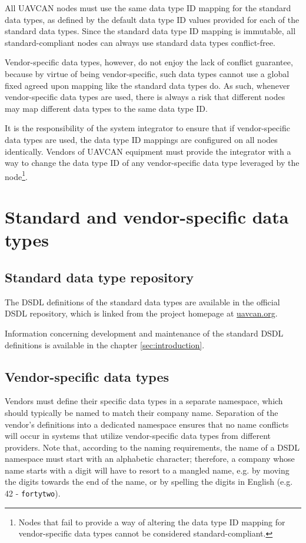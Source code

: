 All UAVCAN nodes must use the same data type ID mapping for the standard data types,
as defined by the default data type ID values provided for each of the standard data types.
Since the standard data type ID mapping is immutable, all standard-compliant nodes can always
use standard data types conflict-free.

Vendor-specific data types, however, do not enjoy the lack of conflict guarantee,
because by virtue of being vendor-specific, such data types cannot use a global
fixed agreed upon mapping like the standard data types do.
As such, whenever vendor-specific data types are used, there is always a risk that
different nodes may map different data types to the same data type ID.

It is the responsibility of the system integrator to ensure that if vendor-specific data types are
used, the data type ID mappings are configured on all nodes identically.
Vendors of UAVCAN equipment must provide the integrator with a way to change the data type ID
of any vendor-specific data type leveraged by the node\footnote{Nodes that fail to provide a way of
altering the data type ID mapping for vendor-specific data types cannot be considered standard-compliant.}.

\section{Standard and vendor-specific data types}

\subsection{Standard data type repository}

The DSDL definitions of the standard data types are available in the official DSDL repository,
which is linked from the project homepage at \href{http://uavcan.org}{uavcan.org}.

Information concerning development and maintenance of the standard DSDL definitions is available
in the chapter \ref{sec:introduction}.

\subsection{Vendor-specific data types}

Vendors must define their specific data types in a separate namespace,
which should typically be named to match their company name.
Separation of the vendor's definitions into a dedicated namespace ensures that no name conflicts will occur
in systems that utilize vendor-specific data types from different providers.
Note that, according to the naming requirements, the name of a DSDL namespace must start
with an alphabetic character; therefore, a company whose name starts with a digit will have to resort to
a mangled name, e.g. by moving the digits towards the end of the name,
or by spelling the digits in English (e.g. 42 - \verb|fortytwo|).

